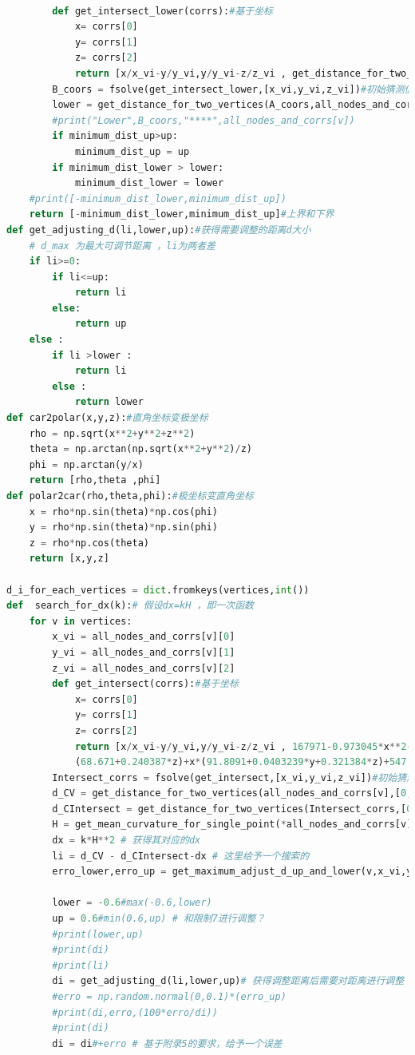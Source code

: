 \documentclass[withoutpreface,bwprint]{cumcmthesis} %
\begin{document}
\begin{appendices}
\begin{lstlisting}[language=python]
        
        def get_intersect_lower(corrs):#基于坐标
            x= corrs[0]
            y= corrs[1]
            z= corrs[2]
            return [x/x_vi-y/y_vi,y/y_vi-z/z_vi , get_distance_for_two_vertices([x,y,z],all_nodes_and_corrs[v_adjacent])-Wij*(1+0.0007)]
        B_coors = fsolve(get_intersect_lower,[x_vi,y_vi,z_vi])#初始猜测值[0,-1]
        lower = get_distance_for_two_vertices(A_coors,all_nodes_and_corrs[v])
        #print("Lower",B_coors,"****",all_nodes_and_corrs[v])
        if minimum_dist_up>up:
            minimum_dist_up = up
        if minimum_dist_lower > lower:
            minimum_dist_lower = lower 
    #print([-minimum_dist_lower,minimum_dist_up])
    return [-minimum_dist_lower,minimum_dist_up]#上界和下界
def get_adjusting_d(li,lower,up):#获得需要调整的距离d大小
    # d_max 为最大可调节距离 ，li为两者差
    if li>=0:
        if li<=up:
            return li
        else:
            return up
    else :
        if li >lower :
            return li
        else :
            return lower 
def car2polar(x,y,z):#直角坐标变极坐标
    rho = np.sqrt(x**2+y**2+z**2)
    theta = np.arctan(np.sqrt(x**2+y**2)/z)
    phi = np.arctan(y/x)
    return [rho,theta ,phi]
def polar2car(rho,theta,phi):#极坐标变直角坐标
    x = rho*np.sin(theta)*np.cos(phi)
    y = rho*np.sin(theta)*np.sin(phi)
    z = rho*np.cos(theta)
    return [x,y,z]

d_i_for_each_vertices = dict.fromkeys(vertices,int())
def  search_for_dx(k):# 假设dx=kH ，即一次函数
    for v in vertices:
        x_vi = all_nodes_and_corrs[v][0]
        y_vi = all_nodes_and_corrs[v][1]
        z_vi = all_nodes_and_corrs[v][2]
        def get_intersect(corrs):#基于坐标
            x= corrs[0]
            y= corrs[1]
            z= corrs[2]
            return [x/x_vi-y/y_vi,y/y_vi-z/z_vi , 167971-0.973045*x**2-0.984919*y**2+y*
            (68.671+0.240387*z)+x*(91.8091+0.0403239*y+0.321384*z)+547.321*z-0.0420355*z**2]
        Intersect_corrs = fsolve(get_intersect,[x_vi,y_vi,z_vi])#初始猜测值[0,-1]
        d_CV = get_distance_for_two_vertices(all_nodes_and_corrs[v],[0,0,0])
        d_CIntersect = get_distance_for_two_vertices(Intersect_corrs,[0,0,0])
        H = get_mean_curvature_for_single_point(*all_nodes_and_corrs[v]) # 获得其对应的曲率
        dx = k*H**2 # 获得其对应的dx 
        li = d_CV - d_CIntersect-dx # 这里给予一个搜索的 
        erro_lower,erro_up = get_maximum_adjust_d_up_and_lower(v,x_vi,y_vi,z_vi) # 给予一个随机误差的范围
        
        lower = -0.6#max(-0.6,lower)
        up = 0.6#min(0.6,up) # 和限制7进行调整？
        #print(lower,up)
        #print(di)
        #print(li)
        di = get_adjusting_d(li,lower,up)# 获得调整距离后需要对距离进行调整
        #erro = np.random.normal(0,0.1)*(erro_up)
        #print(di,erro,(100*erro/di))
        #print(di)
        di = di#+erro # 基于附录5的要求，给予一个误差
       

\end{lstlisting}
\end{appendices}
\end{document}
